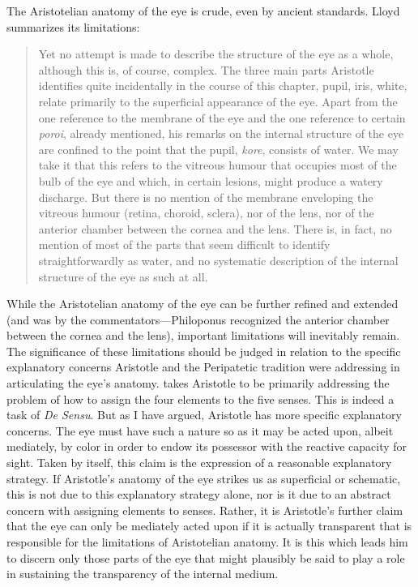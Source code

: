The Aristotelian anatomy of the eye is crude, even by ancient standards. Lloyd summarizes its limitations:
\begin{quote}
	Yet no attempt is made to describe the structure of the eye as a whole, although this is, of course, complex. The three main parts Aristotle identifies quite incidentally in the course of this chapter, pupil, iris, white, relate primarily to the superficial appearance of the eye. Apart from the one reference to the membrane of the eye and the one reference to certain \emph{poroi}, already mentioned, his remarks on the internal structure of the eye are confined to the point that the pupil, \emph{kore}, consists of water. We may take it that this refers to the vitreous humour that occupies most of the bulb of the eye and which, in certain lesions, might produce a watery discharge. But there is no mention of the membrane enveloping the vitreous humour (retina, choroid, sclera), nor of the lens, nor of the anterior chamber between the cornea and the lens. There is, in fact, no mention of most of the parts that seem difficult to identify straightforwardly as water, and no systematic description of the internal structure of the eye as such at all. \citep[220--221]{Lloyd:1978fk}
\end{quote}
While the Aristotelian anatomy of the eye can be further refined and extended (and was by the commentators---Philoponus recognized the anterior chamber between the cor\-nea and the lens), important limitations will inevitably remain. The significance of these limitations should be judged in relation to the specific explanatory concerns Aristotle and the Peripatetic tradition were addressing in articulating the eye's anatomy. \citet{Lloyd:1978fk} takes Aristotle to be primarily addressing the problem of how to assign the four elements to the five senses. This is indeed a task of \emph{De Sensu}. But as I have argued, Aristotle has more specific explanatory concerns. The eye must have such a nature so as it may be acted upon, albeit mediately, by color in order to endow its possessor with the reactive capacity for sight. Taken by itself, this claim is the expression of a reasonable explanatory strategy. If Aristotle's anatomy of the eye strikes us as superficial or schematic, this is not due to this explanatory strategy alone, nor is it due to an abstract concern with assigning elements to senses. Rather, it is Aristotle's further claim that the eye can only be mediately acted upon if it is actually transparent that is responsible for the limitations of Aristotelian anatomy. It is this which leads him to discern only those parts of the eye that might plausibly be said to play a role in sustaining the transparency of the internal medium.


